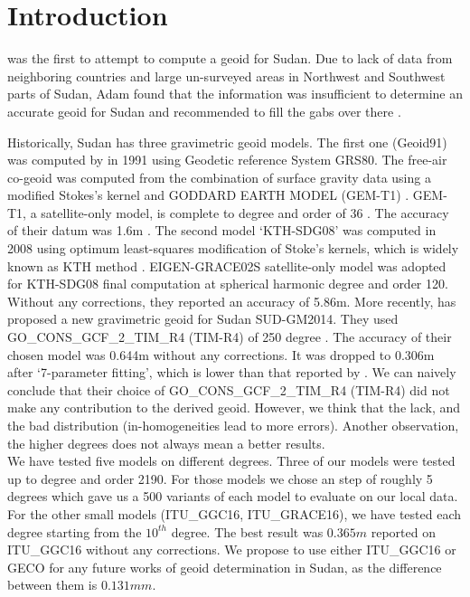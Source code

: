 \pagestyle{fancy}
\chapter{Introduction}
\label{Chapter1}

\cite{osman} was the first to attempt to compute a geoid for Sudan. Due to lack of data from neighboring countries and large un-surveyed areas in Northwest and Southwest parts of Sudan, Adam found that the information was insufficient to determine an accurate geoid for Sudan and recommended to fill the gabs over there \cite{ahmed_msc}. 

Historically, Sudan has three gravimetric geoid models. The first one (Geoid91) was computed by \cite{fashir} in 1991 using Geodetic reference System GRS80. The free-air co-geoid was computed from the combination of surface gravity data using a modified Stokes's kernel and GODDARD EARTH MODEL (GEM-T1)  \cite{fashir}. GEM-T1, a satellite-only model, is complete to degree and order of 36 \cite{nasa}. The accuracy of their datum was 1.6m \cite{fashir, godah}. The second model `KTH-SDG08' was computed in 2008 using optimum least-squares modification of Stoke's kernels, which is widely known as KTH method \cite{ahmed_msc}. EIGEN-GRACE02S satellite-only model was adopted for KTH-SDG08 final computation at spherical harmonic degree and order 120. Without any corrections, they reported an accuracy of 5.86m.
More recently, \citep{godah} has proposed a new gravimetric geoid for Sudan SUD-GM2014. They used GO\_CONS\_GCF\_2\_TIM\_R4 (TIM-R4) of 250 degree \cite{pail}. The accuracy of their chosen model was 0.644m without any corrections. It was dropped to 0.306m after `7-parameter fitting', which is lower than that reported by \citep{ahmed_msc}. We can naively conclude that their choice of GO\_CONS\_GCF\_2\_TIM\_R4 (TIM-R4) did not make any contribution to the derived geoid. However, we think that the lack, and the bad distribution (in-homogeneities lead to more errors). Another observation, the higher degrees does not always mean a better results.
\\
We have tested five models on different degrees. Three of our models were tested up to degree and order 2190. For those models we chose an step of roughly 5 degrees which gave us a 500 variants of each model to evaluate on our local data. For the other small models (ITU\_GGC16, ITU\_GRACE16), we have tested each degree starting from the $10^{th}$ degree. The best result was $0.365m$ reported on ITU\_GGC16 without any corrections. We propose to use either ITU\_GGC16 or GECO for any future works of geoid determination in Sudan, as the difference between them is $0.131mm$.

